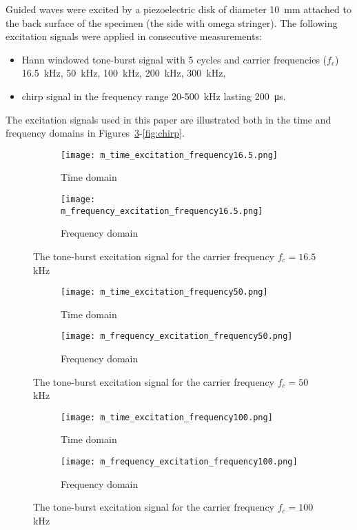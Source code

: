\documentclass[times,final]{elsarticle}
\begin{document}
Guided waves were excited by a piezoelectric disk of diameter \SI{10}{\milli\meter} attached to the back surface of the specimen (the side with omega stringer).
The following excitation signals were applied in consecutive measurements:
\begin{itemize}
\item Hann windowed tone-burst signal with 5 cycles and carrier frequencies (\(f_c\)) \SI{16.5}{\kilo\hertz}, \SI{50}{\kilo\hertz}, \SI{100}{\kilo\hertz}, \SI{200}{\kilo\hertz}, \SI{300}{\kilo\hertz},
\item chirp signal in the frequency range \num{20}-\SI{500}{\kilo\hertz} lasting \SI{200}{\micro\second}.
\end{itemize}
The excitation signals used in this paper are illustrated both in the time and frequency domains in Figures~\ref{fig:exc16_5}-\ref{fig:chirp}.
\begin{figure} [h!]
	\centering
		\begin{subfigure}[b]{0.49\textwidth}
		\texttt{[image: m\_time\_excitation\_frequency16.5.png]}
		\caption{Time domain}
		\label{fig:time_exc16_5}
	\end{subfigure}
	\begin{subfigure}[b]{0.49\textwidth}
		\texttt{[image: m\_frequency\_excitation\_frequency16.5.png]}
		\caption{Frequency domain}
		\label{fig:freq_exc16_5}
	\end{subfigure}
	\caption{The tone-burst excitation signal for the carrier frequency $f_c=16.5$ kHz}
	\label{fig:exc16_5}
\end{figure}
\begin{figure} [h!]
	\centering
		\begin{subfigure}[b]{0.49\textwidth}
		\texttt{[image: m\_time\_excitation\_frequency50.png]}
		\caption{Time domain}
		\label{fig:time_exc50}
	\end{subfigure}
	\begin{subfigure}[b]{0.49\textwidth}
		\texttt{[image: m\_frequency\_excitation\_frequency50.png]}
		\caption{Frequency domain}
		\label{fig:freq_exc50}
	\end{subfigure}
	\caption{The tone-burst excitation signal for the carrier frequency $f_c=50$ kHz}
	\label{fig:exc50}
\end{figure}
\begin{figure} [h!]
	\centering
		\begin{subfigure}[b]{0.49\textwidth}
		\texttt{[image: m\_time\_excitation\_frequency100.png]}
		\caption{Time domain}
		\label{fig:time_exc100}
	\end{subfigure}
	\begin{subfigure}[b]{0.49\textwidth}
		\texttt{[image: m\_frequency\_excitation\_frequency100.png]}
		\caption{Frequency domain}
		\label{fig:freq_exc100}
	\end{subfigure}
	\caption{The tone-burst excitation signal for the carrier frequency $f_c=100$ kHz}
	\label{fig:exc100}
\end{figure}
\end{document}
